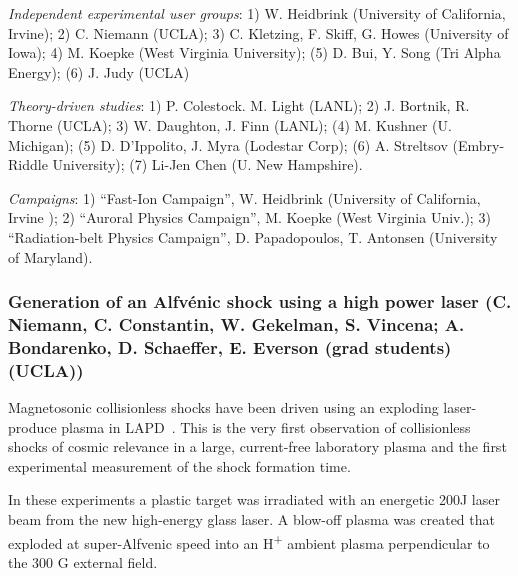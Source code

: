 \documentclass[11pt]{article}
\begin{document}
\begin{description}
\item{\emph{Independent experimental user groups}}: 1) W. Heidbrink
(University of California, Irvine); 2) C. Niemann (UCLA); 3) C. Kletzing, F. Skiff, G. Howes (University of Iowa); 4) M.
Koepke (West Virginia University); (5) D. Bui, Y. Song (Tri Alpha
Energy); (6) J. Judy (UCLA)

\item{\emph{Theory-driven studies}}: 1) P. Colestock. M. Light (LANL);
2) J. Bortnik, R. Thorne (UCLA); 3) W. Daughton, J. Finn (LANL); (4) M.
Kushner (U. Michigan); (5) D. D'Ippolito, J. Myra (Lodestar Corp); (6)
A. Streltsov (Embry-Riddle University); (7) Li-Jen Chen (U. New
Hampshire).

\item{\emph{Campaigns}}: 1) ``Fast-Ion Campaign'', W. Heidbrink
(University of California, Irvine ); 2) ``Auroral Physics Campaign'', M. Koepke (West Virginia Univ.); 3)
``Radiation-belt Physics Campaign'', D. Papadopoulos, T. Antonsen (University of Maryland).
\end{description}



\subsubsection{Generation of an Alfv\'{e}nic shock
using a high power laser  (C. Niemann, C. Constantin, W. Gekelman,
S. Vincena; A. Bondarenko, D. Schaeffer, E. Everson (grad students) (UCLA))}

Magnetosonic collisionless shocks have been driven using an exploding
laser-produce plasma in LAPD~\citep{schaeffer:2014,niemann:2014}. This is the very first
observation of collisionless shocks of cosmic relevance in a large,
current-free laboratory plasma and the first experimental measurement
of the shock formation time.

In these experiments a plastic target was irradiated with an energetic
200J laser beam from the new high-energy glass laser. A blow-off plasma
was created that exploded at super-Alfvenic speed into an
H\textsuperscript{+} ambient plasma perpendicular to the 300 G external
field.
\end{document}
